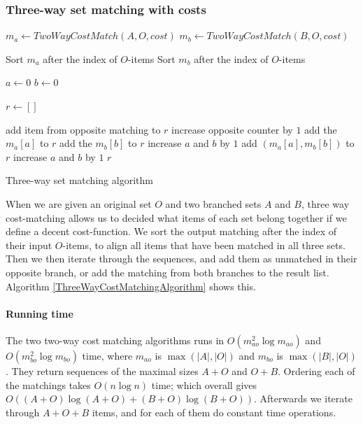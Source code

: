 \documentclass[11pt]{article}
\begin{document}
\subsubsection{Three-way set matching with costs}

\begin{algorithm}
\begin{algorithmic}
	\State $m_a\gets TwoWayCostMatch(A, O, cost)$
	\State $m_b\gets TwoWayCostMatch(B, O, cost)$
	
	\State Sort $m_a$ after the index of $O$-items
	\State Sort $m_b$ after the index of $O$-items

	\State $a \gets 0$
	\State $b \gets 0$
	
	\State $r \gets []$
	
			\State add item from opposite matching to $r$
			\State increase opposite counter by $1$
			\State add the $m_a[a]$ to $r$
			\State add the $m_b[b]$ to $r$
			\State increase $a$ and $b$ by $1$
		\Else
			\State add $(m_a[a], m_b[b])$ to $r$
			\State increase $a$ and $b$ by $1$
		\EndIf
	\EndWhile
	\State \Return $r$
\EndFunction
\end{algorithmic}
\caption{Three-way set matching algorithm}
  \label{ThreeWayCostMatchingAlgorithm}
\end{algorithm}

When we are given an original set $O$ and two branched sets $A$ and $B$, three way cost-matching allows us to decided what items of each set belong together if we define a decent cost-function. We sort the output matching after the index of their input $O$-items, to align all items that have been matched in all three sets. Then we then iterate through the sequences, and add them as unmatched in their opposite branch, or add the matching from both branches to the result list. Algorithm \ref{ThreeWayCostMatchingAlgorithm} shows this.

\paragraph{Running time} The two two-way cost matching algorithms runs in $O(m_{ao}^2 \log m_{ao})$ and $O(m_{bo}^2 \log m_{bo})$ time, where $m_{ao}$ is $\max(|A|, |O|)$ and $m_{bo}$ is $\max(|B|, |O|)$. They return sequences of the maximal sizes $A+O$ and $O+B$. Ordering each of the matchings takes $O(n \log n)$ time; which overall gives $O((A+O) \log (A+O) + (B+O) \log (B+O))$. Afterwards we iterate through $A+O+B$ items, and for each of them do constant time operations.
\end{document}

